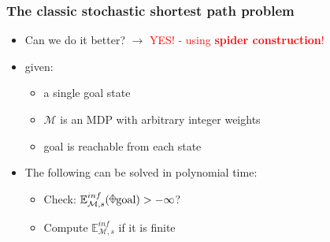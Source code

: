 \documentclass[onlymath]{beamer}
\begin{document}
\begin{frame}
\frametitle{The classic stochastic shortest path problem}
\begin{itemize}
	\item Can we do it better? \pause $\longrightarrow$ \textcolor{red}{YES! - using \textbf{spider construction}!} \pause
	\item given:
	\begin{itemize}
		\item a single goal state
		 \pause
		\item $\mathcal{M}$ is an MDP with arbitrary integer weights
		\item goal is reachable from each state
	\end{itemize}
	\item The following can be solved in polynomial time:
	\begin{itemize}
		\item Check: $\mathbb{E}_{\mathcal{M},s}^{inf}(\rawdiaplus \mathrm{goal}) > - \infty$?
		\item Compute $\mathbb{E}_{\mathcal{M},s}^{inf}$ if it is finite
	\end{itemize}

\end{itemize}
\end{frame}%
\end{document}
